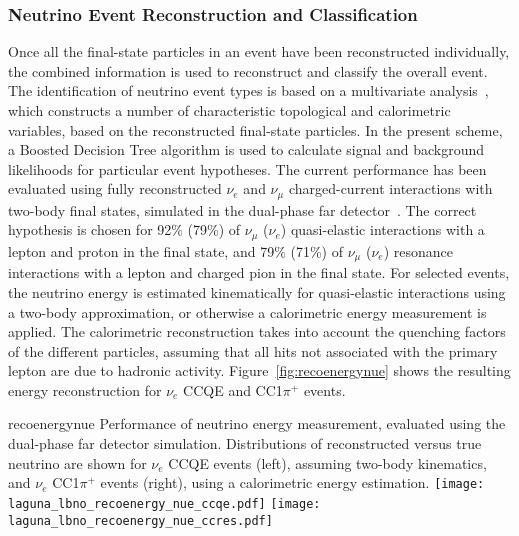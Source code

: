 
\subsubsection{Neutrino Event Reconstruction and Classification}

Once all the final-state particles in an event have been reconstructed individually, 
the combined information is used to reconstruct and classify the overall event.
The identification of neutrino event types is based on a 
multivariate analysis~\cite{Back:2013cva,WA105_TDR,LAGUNA-LBNO-deliv,LAGUNA-LBNO-EOI},
which constructs a number of characteristic topological and calorimetric variables,
based on the reconstructed final-state particles. In the present scheme,
a Boosted Decision Tree algorithm is used to calculate signal and background likelihoods 
for particular event hypotheses. The current performance has been evaluated using fully reconstructed
$\nu_{e}$ and $\nu_{\mu}$ charged-current interactions with two-body final states,
simulated in the dual-phase far detector~\cite{LAGUNA-LBNO-deliv}. 
The correct hypothesis is chosen for 92\% (79\%) of $\nu_{\mu}$ ($\nu_{e}$) quasi-elastic interactions 
with a lepton and proton in the final state, and 79\% (71\%) of $\nu_{\mu}$ ($\nu_{e}$) 
resonance interactions with a lepton and charged pion in the final state.
For selected events, the neutrino energy is estimated kinematically for quasi-elastic interactions
using a two-body approximation, or otherwise a calorimetric energy measurement is applied.
The calorimetric reconstruction takes into account the quenching factors of the different particles, 
assuming that all hits not associated with the primary lepton are due to hadronic activity.
Figure~\ref{fig:recoenergynue} shows the resulting energy reconstruction for $\nu_e$ CCQE and CC1$\pi^{+}$ events.

\begin{cdrfigure}{recoenergynue}
{Performance of neutrino energy measurement, evaluated using the dual-phase far detector simulation. 
Distributions of reconstructed versus true neutrino are shown for $\nu_{e}$ CCQE events (left),
assuming two-body kinematics, and $\nu_{e}$  CC1$\pi^{+}$ events (right),
using a calorimetric energy estimation.}
\texttt{[image: laguna\_lbno\_recoenergy\_nue\_ccqe.pdf]}
\texttt{[image: laguna\_lbno\_recoenergy\_nue\_ccres.pdf]}
\end{cdrfigure}


